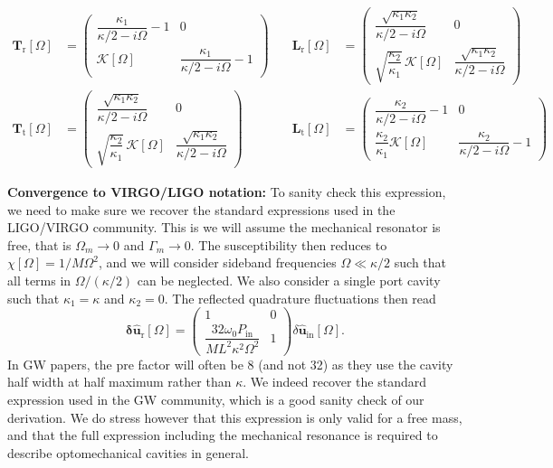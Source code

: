 \begin{equation*}
  \begin{alignedat}{3}
     \mathbf{T}_{\mathrm{r}}[\Omega] &=\begin{pmatrix}
  \dfrac{\kappa_1}{\kappa/2-i\Omega}  -1  & 0 \\
  \mathcal{K}[\Omega]  &  \dfrac{\kappa_1}{\kappa/2-i\Omega}  -1 
\end{pmatrix}  \quad
 & \mathbf{L}_{\mathrm{r}}[\Omega] &= \begin{pmatrix}
   \dfrac{ \sqrt{\kappa_1 \kappa_2}}{\kappa/2-i\Omega}   & 0 \\
  \sqrt{\dfrac{\kappa_2}{\kappa_1}} \, \mathcal{K}[\Omega] &   \dfrac{ \sqrt{\kappa_1 \kappa_2}}{\kappa/2-i\Omega}  
\end{pmatrix} \\
        \mathbf{T}_{\mathrm{t}}[\Omega] &=  \begin{pmatrix}
   \dfrac{ \sqrt{\kappa_1 \kappa_2}}{\kappa/2-i\Omega}   & 0 \\
  \sqrt{\dfrac{\kappa_2}{\kappa_1}} \, \mathcal{K}[\Omega] &   \dfrac{ \sqrt{\kappa_1 \kappa_2}}{\kappa/2-i\Omega}  
\end{pmatrix}  \quad 
& \mathbf{L}_{\mathrm{t}}[\Omega]&= \begin{pmatrix}
  \dfrac{\kappa_2}{\kappa/2-i\Omega}  -1  & 0 \\
  \dfrac{\kappa_2}{\kappa_1}\mathcal{K}[\Omega]  &  \dfrac{\kappa_2}{\kappa/2-i\Omega}  -1 
\end{pmatrix} 
  \end{alignedat}
\end{equation*}


\noindent \textbf{Convergence to VIRGO/LIGO notation:} To sanity check this expression, we need to make sure we recover the standard expressions used in the LIGO/VIRGO community. This is we will assume the mechanical resonator is free, that is $\Omega_m \rightarrow 0$ and $\Gamma_m \rightarrow 0$. The susceptibility then reduces to $\chi[\Omega] = 1/ M \Omega^2$, and we will consider sideband frequencies $\Omega \ll \kappa/2$ such that all terms in $\Omega/(\kappa/2)$ can be neglected. We also consider a single port cavity such that $\kappa_1 = \kappa$ and $\kappa_2=0$. The reflected quadrature fluctuations then read
\begin{equation}
\mathbf{\delta \hat{u}_{\mathrm{r}}}[\Omega]
=
\begin{pmatrix}
  1   & 0 \\[12pt]
  \dfrac{32 \omega_0P_{\mathrm{in}}}{M L^2\kappa^2 \Omega^2}    &  1
\end{pmatrix}
\delta\hat{\mathbf u}_{\mathrm{in}}[\Omega].
\end{equation}
In GW papers, the pre factor will often be 8 (and not 32) as they use the cavity half width at half maximum rather than $\kappa$. We indeed recover the standard expression used in the GW community, which is a good sanity check of our derivation. We do stress however that this expression is only valid for a free mass, and that the full expression including the mechanical resonance is required to describe optomechanical cavities in general. \\


